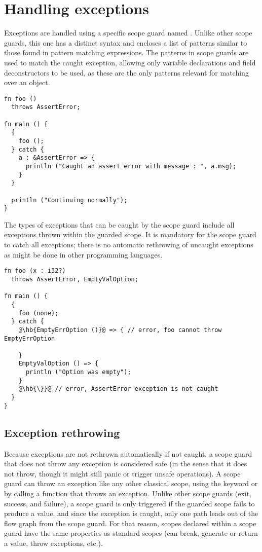 \section{Handling exceptions}
\label{sec:catching_errors}

Exceptions are handled using a specific scope guard named . Unlike
other scope guards, this one has a distinct syntax and encloses a list of
patterns similar to those found in pattern matching expressions. The patterns in
 scope guards are used to match the caught exception, allowing only
variable declarations and field deconstructors to be used, as these are the only
patterns relevant for matching over an object.


\begin{lstlisting}[style=coloredverbatim]
fn foo ()
  throws AssertError;

fn main () {
  {
    foo ();
  } catch {
    a : &AssertError => {
      println ("Caught an assert error with message : ", a.msg);
    }
  }

  println ("Continuing normally");
}
\end{lstlisting}

The types of exceptions that can be caught by the  scope guard
include all exceptions thrown within the guarded scope. It is mandatory for the
scope guard to catch all exceptions; there is no automatic rethrowing of
uncaught exceptions as might be done in other programming languages.

\begin{lstlisting}[style=coloredverbatim, escapechar=@]
fn foo (x : i32?)
  throws AssertError, EmptyValOption;

fn main () {
  {
    foo (none);
  } catch {
    @\hb{EmptyErrOption ()}@ => { // error, foo cannot throw EmptyErrOption

    }
    EmptyValOption () => {
      println ("Option was empty");
    }
    @\hb{\}}@ // error, AssertError exception is not caught
  }
}
\end{lstlisting}

\subsection{Exception rethrowing}

Because exceptions are not rethrown automatically if not caught, a 
scope guard that does not throw any exception is considered safe (in the sense
that it does not throw, though it might still panic or trigger unsafe
operations). A  scope guard can throw an exception like any other
classical scope, using the keyword  or by calling a function that
throws an exception. Unlike other scope guards (exit, success, and failure), a
 scope guard is only triggered if the guarded scope fails to
produce a value, and since the exception is caught, only one path leads out of
the flow graph from the scope guard. For that reason, scopes declared within a
 scope guard have the same properties as standard scopes (can
break, generate or return a value, throw exceptions, etc.).


